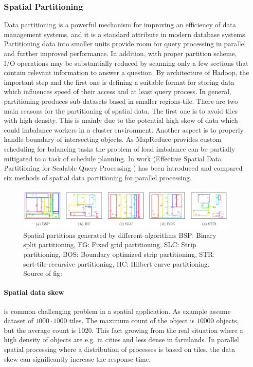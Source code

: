 \documentclass[a4paper,12pt,oneside]{report}
\begin{document}
	\subsubsection{Spatial Partitioning}
	\label{Spatial_Data_Partitioning}
	Data partitioning is a powerful mechanism for improving an efficiency of data
	management systems, 
	and it is a standard attribute in modern database systems. Partitioning data
	into smaller units provide room for query processing in parallel and further
	improved performance. In addition,
	with proper partition scheme, I/O operations may be substantially
	reduced by scanning only a few sections that contain relevant information to
	answer a question.
	By architecture of Hadoop, the important step and the first one is defining a
	suitable format for 
	storing data which influences  speed of their access and at least query process.
	In general,
	partitioning produces sub-datasets based in smaller regions-tile.
	There are two main reasons for the partitioning of spatial data. 
	The first one is to avoid tiles with high density. This is mainly due to the
	potential high 
	skew\cite{spatial_skew} of data which could imbalance workers in a cluster
	environment. Another aspect is to  
	properly handle boundary of intersecting objects. As MapReduce provides custom
	scheduling  for balancing tasks the problem of load imbalance can be partially 
	mitigated to a task of schedule planning. In work (Effective Spatial Data
	Partitioning for Scalable Query 
	Processing \cite{partitioning}) has been introduced and compared six methods of
	spatial data partitioning for parallel processing. 
	
	\begin{figure}[h!]
		\centering
		\includegraphics[width=1\textwidth]{./img/part_overview.png}
		\caption[mapreduce flow]{\centering  Spatial partitions generated by
			different algorithms BSP: Binary split 
			partitioning, FG: Fixed grid
			partitioning, SLC: Strip partitioning, BOS: Boundary optimized strip
			partitioning, STR: sort-tile-recursive
			partitioning, HC: Hilbert curve partitioning. Source of fig:
			\cite{partitioning}}
	\end{figure} 
	
	\paragraph{Spatial data skew} is common challenging problem in a spatial
	application. As example \cite{hadoopGIS} assume dataset of 
	$1000\cdot1000$ tiles. The maximum count of the object is $10 000$ objects, but
	the average count is $1020$. This 
	fact growing from the real situation where a high density of objects are e.g. in
	cities and less dense in farmlands. 
	In parallel spatial processing where a distribution of processes is based on
	tiles, the data skew can significantly 
	increase the response time.
	
\end{document}
